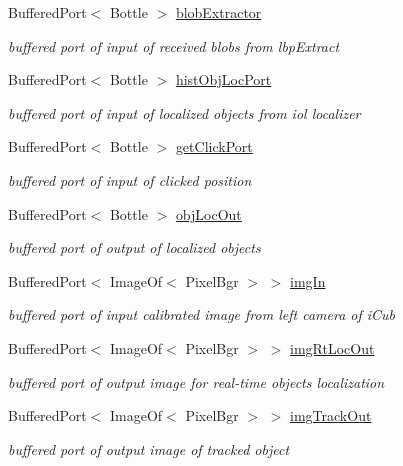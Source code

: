 \begin{DoxyCompactItemize}
Buffered\+Port$<$ Bottle $>$ \hyperlink{group__iol2opc_af1d53efcbe15fda3a7214387d11cb446}{blob\+Extractor}
\begin{DoxyCompactList}\small\item\em buffered port of input of received blobs from lbp\+Extract \end{DoxyCompactList}\item 
Buffered\+Port$<$ Bottle $>$ \hyperlink{group__iol2opc_a5ece3f8300b23d1ae214a641ef3d929e}{hist\+Obj\+Loc\+Port}
\begin{DoxyCompactList}\small\item\em buffered port of input of localized objects from iol localizer \end{DoxyCompactList}\item 
Buffered\+Port$<$ Bottle $>$ \hyperlink{group__iol2opc_a01f92df086689f5c3cfe172bc2e67d52}{get\+Click\+Port}
\begin{DoxyCompactList}\small\item\em buffered port of input of clicked position \end{DoxyCompactList}\item 
Buffered\+Port$<$ Bottle $>$ \hyperlink{group__iol2opc_a88a2df81712e21c9cc2b8f91ee4bbe38}{obj\+Loc\+Out}
\begin{DoxyCompactList}\small\item\em buffered port of output of localized objects \end{DoxyCompactList}\item 
Buffered\+Port$<$ Image\+Of$<$ Pixel\+Bgr $>$ $>$ \hyperlink{group__iol2opc_a555425396bb28c42fc80bec3f5479558}{img\+In}
\begin{DoxyCompactList}\small\item\em buffered port of input calibrated image from left camera of i\+Cub \end{DoxyCompactList}\item 
Buffered\+Port$<$ Image\+Of$<$ Pixel\+Bgr $>$ $>$ \hyperlink{group__iol2opc_a65d96ea254077eae418dc53dd7c62a9a}{img\+Rt\+Loc\+Out}
\begin{DoxyCompactList}\small\item\em buffered port of output image for real-\/time objects localization \end{DoxyCompactList}\item 
Buffered\+Port$<$ Image\+Of$<$ Pixel\+Bgr $>$ $>$ \hyperlink{group__iol2opc_a7c0aeec18511fb66b6281b82ddd14c24}{img\+Track\+Out}
\begin{DoxyCompactList}\small\item\em buffered port of output image of tracked object \end{DoxyCompactList}\item 

\end{DoxyCompactItemize}
